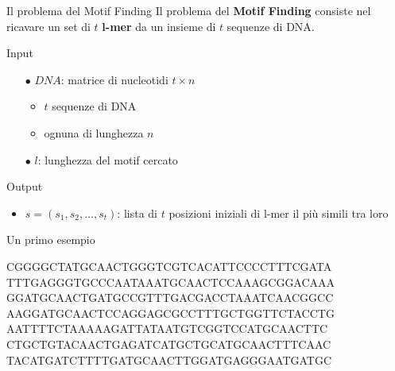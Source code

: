 	\begin{frame}{Il problema del Motif Finding}
		Il problema del \alert{\textbf{Motif Finding}} consiste nel ricavare un set di $t$ \alert{\textbf{l-mer}} da un insieme di $t$ sequenze di DNA.
		\begin{block}{Input}
			\begin{itemize}
				\item[$\bullet$] $DNA$: matrice di nucleotidi $t \times n$
				\begin{itemize}
					\item $t$ sequenze di DNA
					\item ognuna di lunghezza $n$
				\end{itemize}
				\item[$\bullet$] $l$: lunghezza del motif cercato
			\end{itemize}
		\end{block}
		\begin{block}{Output}
			\begin{itemize}
				\item $s=(s_1,s_2,\dots,s_t)$: lista di $t$ posizioni iniziali di l-mer il più simili tra loro
			\end{itemize}
		\end{block}
	\end{frame}
	
	\begin{frame}{Un primo esempio}
		\begin{center}
			CGGGGCT\onslide<1,2>ATGCAACT\onslide<1>GGGTCGTCACATTCCCCTTTCGATA\\
			TTTGAGGGTGCCCAATAA\onslide<1,2>ATGCAACT\onslide<1>CCAAAGCGGACAAA\\
			GG\onslide<1,2>ATGCAACT\onslide<1>GATGCCGTTTGACGACCTAAATCAACGGCC\\
			AAGG\onslide<1,2>ATGCAACT\onslide<1>CCAGGAGCGCCTTTGCTGGTTCTACCTG\\
			AATTTTCTAAAAAGATTATAATGTCGGTCC\onslide<1,2>ATGCAACT\onslide<1>TC\\
			CTGCTGTACAACTGAGATCATGCTGC\onslide<1,2>ATGCAACT\onslide<1>TTCAAC\\
			TACATGATCTTTTG\onslide<1,2>ATGCAACT\onslide<1>TGGATGAGGGAATGATGC
		\end{center}
	\end{frame}
	

